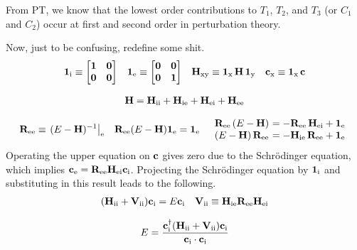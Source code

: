 \documentclass[11pt]{article}
\numberwithin{equation}{section}
\begin{document}
\begin{rmk}
From PT, we know that the lowest order contributions to $T_1$, $T_2$, and $T_3$ (or $C_1$ and $C_2$) occur at first and second order in perturbation theory.

\end{rmk}

Now, just to be confusing, redefine some shit.
\begin{align}
  \bo{1}_\mr{i}
\equiv
\pma[l]{
  \bo{1} & \bo{0} \\
  \bo{0} & \bo{0}
}
&&
  \bo{1}_\mr{e}
\equiv
\pma[l]{
  \bo{0} & \bo{0} \\
  \bo{0} & \bo{1}
}
&&
  \bo{H}_\mr{xy}
\equiv
  \bo{1}_\mr{x}\,
  \bo{H}\,
  \bo{1}_\mr{y}
&&
  \bo{c}_\mr{x}
\equiv
  \bo{1}_\mr{x}\,
  \bo{c}
\end{align}

\begin{align}
  \mathbf{H}
=
  \mathbf{H}_{\mathrm{ii}}
+
  \mathbf{H}_{\mathrm{ie}}
+
  \mathbf{H}_{\mathrm{ei}}
+
  \mathbf{H}_{\mathrm{ee}}
\end{align}

\begin{align}
  \bo{R}_\mr{ee}
\equiv
\left.
  (
    E
  -
    \bo{H}
  )^{-1}
\right|_\mr{e}
&&
  \bo{R}_\mr{ee}
  (
    E
  -
    \bo{H}
  )
  \bo{1}_\mr{e}
=
  \bo{1}_\mr{e}
&&
\begin{array}{r@{\ }l}
  \bo{R}_\mr{ee}\,
  (
    E
  -
    \bo{H}
  )
&=
-
  \bo{R}_\mr{ee}\,
  \bo{H}_\mr{ei}
+
  \bo{1}_\mr{e}
\\
  (
    E
  -
    \bo{H}
  )\,
  \bo{R}_\mr{ee}
&=
-
  \bo{H}_\mr{ie}\,
  \bo{R}_\mr{ee}
+
  \bo{1}_\mr{e}
\end{array}
\end{align}
Operating the upper equation on $\mathbf{c}$ gives zero due to the Schr\"odinger equation, which implies
$
  \mathbf{c}_{\mathrm{e}}
=
  \mathbf{R}_{\mathrm{ee}}
  \mathbf{H}_{\mathrm{ei}}
  \mathbf{c}_{\mathrm{i}}
$.
Projecting the Schr\"odinger equation by $\mathbf{1}_{\mathrm{i}}$ and substituting in this result leads to the following.
\begin{align}
  (
    \mathbf{H}_{\mathrm{ii}}
  +
    \mathbf{V}_{\mathrm{ii}}
  )
  \mathbf{c}_{\mathrm{i}}
=
  E
  \mathbf{c}_{\mathrm{i}}
&&
  \mathbf{V}_{\mathrm{ii}}
\equiv
  \mathbf{H}_{\mathrm{ie}}
  \mathbf{R}_{\mathrm{ee}}
  \mathbf{H}_{\mathrm{ei}}
\end{align}

\begin{align}
  E
=
  \frac {
    \mathbf{c}_{\mathrm{i}}^\dagger
    (
      \mathbf{H}_{\mathrm{ii}}
    +
      \mathbf{V}_{\mathrm{ii}}
    )
    \mathbf{c}_{\mathrm{i}}
  }{
    \mathbf{c}_{\mathrm{i}}\cdot
    \mathbf{c}_{\mathrm{i}}
  }
\end{align}
\end{document}
